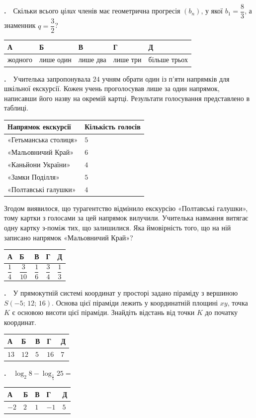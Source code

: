 \documentclass[12pt]{article}
\newcommand{\answerTable}[5]{%
\par\vspace{0.15cm}
\noindent
\begin{tabular}{|*{5}{>{\centering\arraybackslash}m{3cm}|}}
\hline
\rule[-0.15cm]{0pt}{0.6cm}\textbf{А} & \rule[-0.15cm]{0pt}{0.6cm}\textbf{Б} & \rule[-0.15cm]{0pt}{0.6cm}\textbf{В} & \rule[-0.15cm]{0pt}{0.6cm}\textbf{Г} & \rule[-0.15cm]{0pt}{0.6cm}\textbf{Д} \\
\hline
\rule[-0.2cm]{0pt}{0.75cm}#1 & \rule[-0.2cm]{0pt}{0.75cm}#2 & \rule[-0.2cm]{0pt}{0.75cm}#3 & \rule[-0.2cm]{0pt}{0.75cm}#4 & \rule[-0.2cm]{0pt}{0.75cm}#5 \\
\hline
\end{tabular}
\par\vspace{0.25cm}
}
\newcommand{\answerTableTall}[5]{%
\par\vspace{0.15cm}
\noindent
\begin{tabular}{|*{5}{>{\centering\arraybackslash}m{3cm}|}}
\hline
\rule[-0.2cm]{0pt}{0.7cm}\textbf{А} & \rule[-0.2cm]{0pt}{0.7cm}\textbf{Б} & \rule[-0.2cm]{0pt}{0.7cm}\textbf{В} & \rule[-0.2cm]{0pt}{0.7cm}\textbf{Г} & \rule[-0.2cm]{0pt}{0.7cm}\textbf{Д} \\
\hline
\rule[-0.45cm]{0pt}{1.2cm}#1 & \rule[-0.45cm]{0pt}{1.2cm}#2 & \rule[-0.45cm]{0pt}{1.2cm}#3 & \rule[-0.45cm]{0pt}{1.2cm}#4 & \rule[-0.45cm]{0pt}{1.2cm}#5 \\
\hline
\end{tabular}
\par\vspace{0.25cm}
}
\newcounter{zad}
\newcommand{\zadtask}[1]{\stepcounter{zad}\par\vspace{0.3cm}\noindent\textbf{\thezad.}\ \ #1\par\vspace{0.2cm}}
\begin{document}
\zadtask{Скільки всього \textit{цілих} членів має геометрична прогресія $(b_n)$, у якої $b_1 = \dfrac{8}{3}$, а знаменник $q = \dfrac{3}{2}$?}
\answerTable{жодного}{лише один}{лише два}{лише три}{більше трьох}
\newpage

\zadtask{Учителька запропонувала $24$ учням обрати один із п'яти напрямків для шкільної екскурсії. Кожен учень проголосував лише за один напрямок, написавши його назву на окремій картці. Результати голосування представлено в таблиці.
\vspace{0.2cm}

\noindent\begin{center}
\renewcommand{\arraystretch}{1.25}
\begin{tabular}{|>{\raggedright\arraybackslash}m{5.5cm}|>{\centering\arraybackslash}m{3cm}|}
\hline
\textbf{Напрямок екскурсії} & \textbf{Кількість голосів} \\
\hline
«Гетьманська столиця» & $5$ \\
\hline
«Мальовничий Край» & $6$ \\
\hline
«Каньйони України» & $4$ \\
\hline
«Замки Поділля» & $5$ \\
\hline
«Полтавські галушки» & $4$ \\
\hline
\end{tabular}
\end{center}
\vspace{0.2cm}

Згодом виявилося, що турагентство відмінило екскурсію «Полтавські галушки», тому картки з голосами за цей напрямок вилучили. Учителька навмання витягає одну картку з-поміж тих, що залишилися. Яка ймовірність того, що на ній записано напрямок «Мальовничий Край»?}
\answerTableTall{$\dfrac{1}{4}$}{$\dfrac{3}{10}$}{$\dfrac{1}{6}$}{$\dfrac{3}{4}$}{$\dfrac{1}{3}$}

\zadtask{У прямокутній системі координат у просторі задано піраміду з вершиною $S(-5;\, 12;\, 16)$. Основа цієї піраміди лежить у координатній площині $xy$, точка $K$ є основою висоти цієї піраміди. Знайдіть відстань від точки $K$ до початку координат.}
\answerTable{$13$}{$12$}{$5$}{$16$}{$7$}

\zadtask{$\log_2 8 - \log_{\frac{1}{5}} 25 = $}
\answerTable{$-2$}{$2$}{$1$}{$-1$}{$5$}
\end{document}
